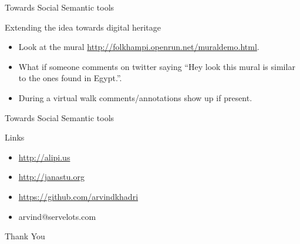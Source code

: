 \documentclass[''urlcolor=red'']{beamer}
\begin{document}
\begin{frame}{Towards Social Semantic tools}
  \begin{block}{Extending the idea towards digital heritage}
    \begin{itemize}
    \item Look at the mural \url{http://folkhampi.openrun.net/muraldemo.html}.
    \item What if someone comments on twitter saying ``Hey look this mural is similar to the ones found in Egypt.''.
    \item During a virtual walk comments/annotations show up if present.
    \end{itemize}
  \end{block}
\end{frame}

\begin{frame}{Towards Social Semantic tools}
  \begin{block}{Links}
    \begin{itemize}
    \item \url{http://alipi.us}
    \item \url{http://janastu.org}
    \item \url{https://github.com/arvindkhadri}
    \item arvind@servelots.com
    \end{itemize}
    \center Thank You
  \end{block}
\end{frame}
\end{document}
